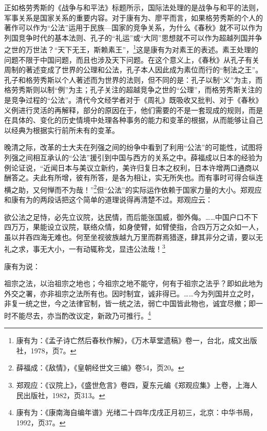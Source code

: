 \documentclass[a4paper, 12pt, openright]{ctexbook}
\renewenvironment{quote}
  {\list{}{\rightmargin2\ccwd \leftmargin2\ccwd \itemindent=2\ccwd \listparindent=2\ccwd}%
   \item\relax\small\kaishu\color{black}}
  {\endlist}
\begin{document}
正如格劳秀斯的《战争与和平法》标题所示，国际法处理的是战争与和平的法则，军事关系是国家关系的重要内容。对于康有为、廖平而言，如果格劳秀斯的个人的著作可以作为“公法”运用于民族—国家的竞争关系，为什么《春秋》就不可以作为列国竞争时代的基本法则、孔子的“礼运”或“大同”思想就不可以作为超越列国并争之世的万世法？“天下无王，斯赖素王”，\footnote{康有为：《孟子诗亡然后春秋作解》，《万木草堂遗稿》卷一，台北，成文出版社，1978，页7。}这是康有为对素王的表述。素王处理的问题不限于中国问题，而且也涉及天下问题。在这个意义上，《春秋》从孔子有关周制的著述变成了世界的公理和公法，孔子本人因此成为素位而行的“制法之王”。孔子和格劳秀斯以个人著述而为世界的法则，但不同的是：孔子以制“义”为主，而格劳秀斯则以制“例”为主；孔子关注的超越竞争之世的“公理”，而格劳秀斯关注的是竞争过程的“公法”。清代今文经学者对于《周礼》既吸收又批判、对于《春秋》义例进行灵活的再解释，部分的原因在于，他们需要的不是一套现成的规则，而是在具体的、变化的历史情境中处理各种事务的能力和变革的根据，从而能够让自己以经典为根据实行前所未有的变革。

晚清之际，改革的士大夫在列强之间的纷争中看到了利用“公法”的可能性，试图将列强之间相互承认的“公法”援引到中国与西方的关系之中。薛福成以日本的经验为例论证说，“近闻日本与美议立新约，美许归复日本之权利，日本许增两口通商以酬答之。夫此有所增，彼有所答，是各为相让，实无所失也。而有事时可得合纵连横之助，又何惮而不为哉！”\footnote{薛福成：《敌情》，《皇朝经世文三编》卷54，页20。}但“公法”的实际运作依赖于国家力量的大小。郑观应和康有为的两段话把这个简单的道理说得再清楚不过。郑观应云：

\begin{quote}
欲公法之足恃，必先立议院，达民情，而后能张国威，御外侮。……中国户口不下四万万，果能设立议院，联络众情，如身使臂，如臂使指，合四万万之众如一人，虽以并吞四海无难也。何至坐视彼族越九万里而群焉猎逐，肆其非分之请，要以无礼之求，事无大小，一有动辄称戈，显违公法哉！\footnote{郑观应：《议院上》，《盛世危言》卷四，夏东元编《郑观应集》上卷，上海人民出版社，1982，页313。}
\end{quote}

康有为说：

\begin{quote}
祖宗之法，以治祖宗之地也；今祖宗之地不能守，何有于祖宗之法乎？即如此地为外交之署，亦非祖宗之法所有也。因时制宜，诚非得已。……今为列国并立之时，非复一统之世，今之法律官制，皆一统之法，弱亡中国皆此物也，诚宜尽撤；即一时不能尽去，亦当酌改议定，新政乃可推行。\footnote{康有为：《康南海自编年谱》光绪二十四年戊戌正月初三，北京：中华书局，1992，页37。}
\end{quote}
\end{document}
